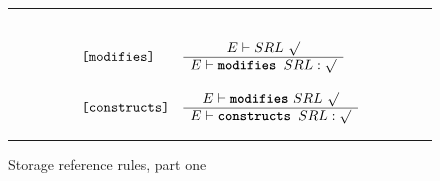 \documentclass[12pt]{article} %
\newcommand{\reserved}[1]{\textbf{\texttt{#1}}} %
\newcommand{\RULELAB}[1]{\texttt{#1}}
\newcommand{\UNSPACEFORBOX}{\vspace{-2ex}}
\newcommand{\HLINE}{\UNSPACEFORBOX%
\begin{flushleft}\rule{\textwidth}{0.01in}\end{flushleft}%
\UNSPACEFORBOX}
\newenvironment{BFIGURE}{

\begin{figure}
\small
\HLINE
}{
\HLINE
\normalsize
\end{figure}
}
\begin{document}
\begin{BFIGURE}
\begin{displaymath}
\begin{array}{lll}
~\\
\RULELAB{[modifies]} &
\begin{array}{c}
E \vdash SRL~\surd \\
\hline
E \vdash \mbox{\reserved{modifies }} SRL: \surd
\end{array}
\\
~\\
\RULELAB{[constructs]} &
\begin{array}{c}
E \vdash \reserved{modifies}~ SRL~\surd \\
\hline
E \vdash \mbox{\reserved{constructs }} SRL: \surd
\end{array}
\end{array}
\end{displaymath}
\caption{Storage reference rules, part one}
\label{ref-fig}
\end{BFIGURE}
\end{document}
